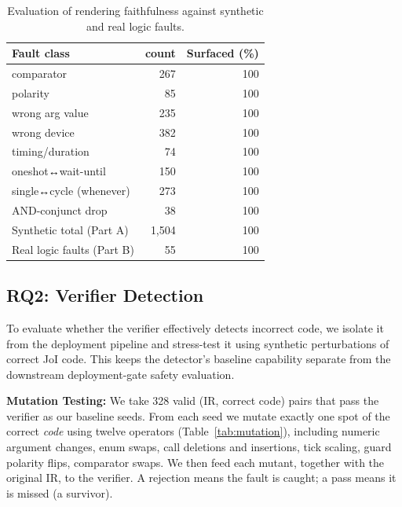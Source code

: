 \documentclass[sigconf,nonacm,anonymous,review]{acmart}
\begin{document}
\begin{table}[t]
\centering
\caption{Evaluation of rendering faithfulness against synthetic and real logic faults.} %
\label{tab:faithful}
\small
\begin{tabular}{lrr}
\toprule
Fault class & count & Surfaced (\%) \\
\midrule
comparator                & 267 & 100 \\
polarity                  & 85  & 100 \\
wrong arg value           & 235 & 100 \\
wrong device              & 382 & 100 \\
timing/duration           & 74  & 100 \\
oneshot↔wait-until        & 150 & 100 \\
single↔cycle (whenever)   & 273 & 100 \\
AND-conjunct drop         & 38  & 100 \\
\midrule
Synthetic total (Part A)   & 1,504 & 100 \\
Real logic faults (Part B) & 55  & 100 \\
\bottomrule
\end{tabular}
\end{table}

\subsection{RQ2: Verifier Detection}
To evaluate whether the verifier effectively detects incorrect code, we isolate it from the deployment pipeline and stress-test it using synthetic perturbations of correct JoI code. This keeps the detector’s baseline capability separate from the downstream deployment-gate safety evaluation.

\textbf{Mutation Testing:} %
We take 328 valid (IR, correct code) pairs that pass the verifier as our baseline seeds. From each seed we mutate exactly one spot of the correct \emph{code} using twelve operators (Table~\ref{tab:mutation}), including numeric argument changes, enum swaps, call deletions and insertions, tick scaling, guard polarity flips, comparator swaps. %
We then feed each mutant, together with the original IR, to the verifier. A rejection means the fault is caught; a pass means it is missed (a survivor). %
\end{document}
